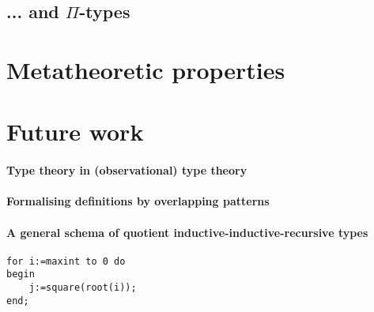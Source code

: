 \documentclass[a4paper,UKenglish,numberwithinsect,cleveref,thm-restate]{lipics-v2021}
\begin{document}
\subsection{... and \texorpdfstring{$\Pi$}{Π}-types} \label{subsec:SC+U+Pi}

\section{Metatheoretic properties}

\section{Future work}

\paragraph*{Type theory in (observational) type theory}

\paragraph*{Formalising definitions by overlapping patterns}

\paragraph*{A general schema of quotient inductive-inductive-recursive types}


\appendix

\begin{conjecture}\label{testenv-conjecture}
\end{conjecture}

\begin{claim}\label{testenv-claim}
\end{claim}

\begin{claim*}\label{testenv-claim2}
\end{claim*}

\begin{claimproof}
\end{claimproof}
\begin{lstlisting}[caption={Formal definition in \Agda},label=list:8-6,captionpos=t,float,abovecaptionskip=-\medskipamount]
for i:=maxint to 0 do 
begin 
    j:=square(root(i));
end;
\end{lstlisting}
\end{document}
